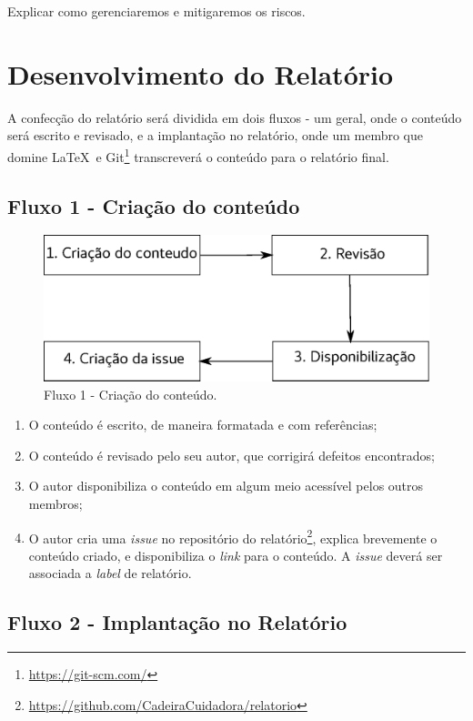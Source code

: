 Explicar como gerenciaremos e mitigaremos os riscos.

\section{Desenvolvimento do Relatório}

A confecção do relatório será dividida em dois fluxos - um geral, onde o
conteúdo será escrito e revisado, e a implantação no relatório, onde um
membro que domine \LaTeX\ e
Git\footnote{\url{https://git-scm.com/}} transcreverá o conteúdo para o
relatório final.

\subsection{Fluxo 1 - Criação do conteúdo}

\begin{figure}[H]
  \centering
    \includegraphics[width=\textwidth]{figuras/fluxo1.eps}
  \caption{Fluxo 1 - Criação do conteúdo.}
  \label{fig:fluxo1}
\end{figure}

\begin{enumerate}
  \item O conteúdo é escrito, de maneira formatada e com referências;
  \item O conteúdo é revisado pelo seu autor, que corrigirá defeitos encontrados;
  \item O autor disponibiliza o conteúdo em algum meio acessível pelos outros membros;
  \item O autor cria uma \textit{issue} no repositório do
    relatório\footnote{\url{https://github.com/CadeiraCuidadora/relatorio}}, explica brevemente
    o conteúdo criado, e disponibiliza o \textit{link} para o conteúdo. A \textit{issue} deverá ser associada a \textit{label} de relatório.
\end{enumerate}

\subsection{Fluxo 2 - Implantação no Relatório}

